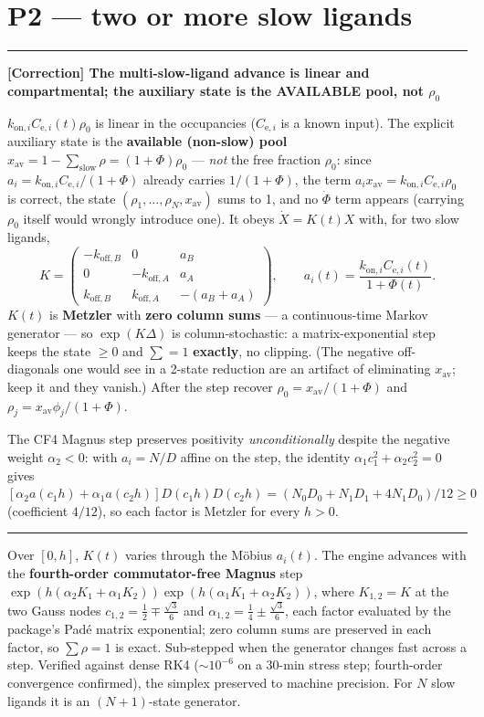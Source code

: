 \documentclass[11pt]{article}
\newenvironment{correction}[1]
  {\par\vspace{0.3em}\noindent\textcolor{corrcol}{\rule{\linewidth}{0.4pt}}\par
   \noindent\textbf{\textcolor{corrcol}{[Correction] #1}}\par\nopagebreak\vspace{0.2em}}
  {\par\noindent\textcolor{corrcol}{\rule{\linewidth}{0.4pt}}\par\vspace{0.3em}}
\newcommand{\Cesub}[1]{C_{\mathrm{e},#1}}
\newcommand{\kon}[1][]{k_{\mathrm{on}#1}}
\newcommand{\koff}[1][]{k_{\mathrm{off}#1}}
\newcommand{\rhoz}{\rho_0}
\begin{document}
\section{P2 --- two or more slow ligands}
\label{sec:p2}

\begin{correction}{The multi-slow-ligand advance is linear and compartmental; the auxiliary state is the AVAILABLE pool, not $\rhoz$}
$\kon[,i]\Cesub{i}(t)\rhoz$ is linear in the occupancies ($\Cesub{i}$ is a known
input). The explicit auxiliary state is the \textbf{available (non-slow) pool}
$x_{\mathrm{av}}=1-\sum_{\mathrm{slow}}\rho=(1+\Phi)\rhoz$ --- \emph{not} the free
fraction $\rhoz$: since $a_i=\kon[,i]\Cesub{i}/(1+\Phi)$ already carries $1/(1+\Phi)$,
the term $a_i x_{\mathrm{av}}=\kon[,i]\Cesub{i}\rhoz$ is correct, the state
$(\rho_1,\dots,\rho_N,x_{\mathrm{av}})$ sums to 1, and no $\dot\Phi$ term appears
(carrying $\rhoz$ itself would wrongly introduce one). It obeys $\dot X=K(t)X$ with,
for two slow ligands,
%
\begin{equation}
K=\begin{pmatrix}
-\koff[,B] & 0 & a_B\\
0 & -\koff[,A] & a_A\\
\koff[,B] & \koff[,A] & -(a_B+a_A)
\end{pmatrix},\qquad a_i(t)=\frac{\kon[,i]\Cesub{i}(t)}{1+\Phi(t)}.
\label{eq:generator}
\end{equation}
%
$K(t)$ is \textbf{Metzler} with \textbf{zero column sums} --- a continuous-time
Markov generator --- so $\exp(K\Delta)$ is column-stochastic: a matrix-exponential
step keeps the state $\ge0$ and $\sum=1$ \textbf{exactly}, no clipping. (The
negative off-diagonals one would see in a 2-state reduction are an artifact of
eliminating $x_{\mathrm{av}}$; keep it and they vanish.) After the step recover
$\rhoz=x_{\mathrm{av}}/(1+\Phi)$ and $\rho_j=x_{\mathrm{av}}\phi_j/(1+\Phi)$.

The CF4 Magnus step preserves positivity \emph{unconditionally} despite the negative
weight $\alpha_2<0$: with $a_i=N/D$ affine on the step, the identity
$\alpha_1 c_1^2+\alpha_2 c_2^2=0$ gives
$[\alpha_2 a(c_1 h)+\alpha_1 a(c_2 h)]D(c_1 h)D(c_2 h)=(N_0D_0+N_1D_1+4N_1D_0)/12\ge0$
(coefficient $4/12$), so each factor is Metzler for every $h>0$.
\end{correction}

Over $[0,h]$, $K(t)$ varies through the M\"obius $a_i(t)$. The engine advances
with the \textbf{fourth-order commutator-free Magnus} step
$\exp(h(\alpha_2 K_1{+}\alpha_1 K_2))\exp(h(\alpha_1 K_1{+}\alpha_2 K_2))$, where
$K_{1,2}=K$ at the two Gauss nodes $c_{1,2}=\tfrac12\mp\tfrac{\sqrt3}6$ and
$\alpha_{1,2}=\tfrac14\pm\tfrac{\sqrt3}6$, each factor evaluated by the package's
Pad\'e matrix exponential; zero column sums are preserved in each factor, so
$\sum\rho=1$ is exact. Sub-stepped when the generator changes fast across a step.
Verified against dense RK4 ($\sim\!10^{-6}$ on a 30-min stress step; fourth-order
convergence confirmed), the simplex preserved to machine precision. For $N$ slow
ligands it is an $(N{+}1)$-state generator.
\end{document}
